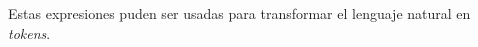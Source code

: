 \documentclass[../main.tex]{subfiles}
\begin{document}
Estas expresiones puden ser usadas para transformar el lenguaje natural en \emph{tokens}.


%
%
%
%
%
\end{document}
